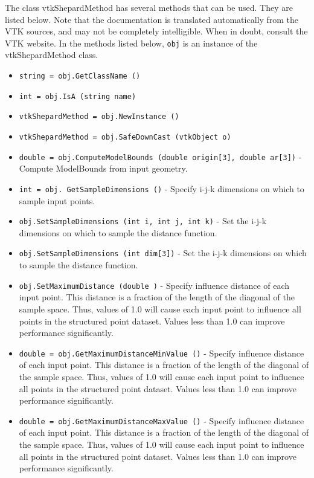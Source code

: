 The class vtkShepardMethod has several methods that can be used.
  They are listed below.
Note that the documentation is translated automatically from the VTK sources,
and may not be completely intelligible.  When in doubt, consult the VTK website.
In the methods listed below, \verb|obj| is an instance of the vtkShepardMethod class.
\begin{itemize}
\item  \verb|string = obj.GetClassName ()|

\item  \verb|int = obj.IsA (string name)|

\item  \verb|vtkShepardMethod = obj.NewInstance ()|

\item  \verb|vtkShepardMethod = obj.SafeDownCast (vtkObject o)|

\item  \verb|double = obj.ComputeModelBounds (double origin[3], double ar[3])| -  Compute ModelBounds from input geometry.

\item  \verb|int = obj. GetSampleDimensions ()| -  Specify i-j-k dimensions on which to sample input points.

\item  \verb|obj.SetSampleDimensions (int i, int j, int k)| -  Set the i-j-k dimensions on which to sample the distance function.

\item  \verb|obj.SetSampleDimensions (int dim[3])| -  Set the i-j-k dimensions on which to sample the distance function.

\item  \verb|obj.SetMaximumDistance (double )| -  Specify influence distance of each input point. This distance is a 
 fraction of the length of the diagonal of the sample space. Thus, values 
 of 1.0 will cause each input point to influence all points in the 
 structured point dataset. Values less than 1.0 can improve performance
 significantly.

\item  \verb|double = obj.GetMaximumDistanceMinValue ()| -  Specify influence distance of each input point. This distance is a 
 fraction of the length of the diagonal of the sample space. Thus, values 
 of 1.0 will cause each input point to influence all points in the 
 structured point dataset. Values less than 1.0 can improve performance
 significantly.

\item  \verb|double = obj.GetMaximumDistanceMaxValue ()| -  Specify influence distance of each input point. This distance is a 
 fraction of the length of the diagonal of the sample space. Thus, values 
 of 1.0 will cause each input point to influence all points in the 
 structured point dataset. Values less than 1.0 can improve performance
 significantly.


\end{itemize}
